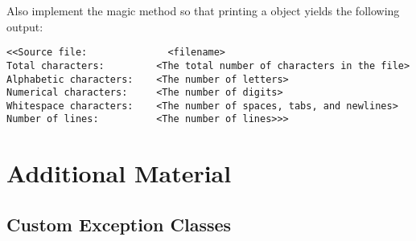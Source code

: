 \begin{problem}
Also implement the  magic method so that printing a  object yields the following output:
\begin{lstlisting}
<<Source file:              <filename>
Total characters:         <The total number of characters in the file>
Alphabetic characters:    <The number of letters>
Numerical characters:     <The number of digits>
Whitespace characters:    <The number of spaces, tabs, and newlines>
Number of lines:          <The number of lines>>>
\end{lstlisting}

\begin{comment}
Examples:

\begin{lstlisting}
# example.txt
a b c
d e f
\end{lstlisting}

\begin{lstlisting}
>>> cf = ContentFilter("example.txt")

>>> cf.uniform("uniform.txt", mode='w', case="upper")
>>> cf.uniform("uniform.txt", mode='a', case="lower")

>>> cf.reverse("reverse.txt", mode='w', unit="word")
>>> cf.reverse("reverse.txt", mode='a', unit="line")

>>> cf.transpose("transpose.txt", mode='w')
\end{lstlisting}

\begin{lstlisting}
# uniform.txt
A B C
D E F
a b c
d e f
\end{lstlisting}

\begin{lstlisting}
# reverse.txt
c b a
f e d
d e f
a b c
\end{lstlisting}

\begin{lstlisting}
a d
b e
c f
\end{lstlisting}
\end{comment}

\end{problem}

\newpage

\section*{Additional Material} %

\subsection*{Custom Exception Classes} %

